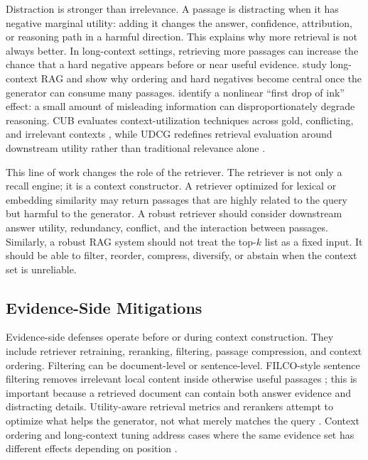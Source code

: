 \documentclass[11pt]{article}
\begin{document}
Distraction is stronger than irrelevance. A passage is distracting when it has negative marginal utility: adding it changes the answer, confidence, attribution, or reasoning path in a harmful direction. This explains why more retrieval is not always better. In long-context settings, retrieving more passages can increase the chance that a hard negative appears before or near useful evidence. \citet{rrag039} study long-context RAG and show why ordering and hard negatives become central once the generator can consume many passages. \citet{rrag003} identify a nonlinear ``first drop of ink'' effect: a small amount of misleading information can disproportionately degrade reasoning. CUB evaluates context-utilization techniques across gold, conflicting, and irrelevant contexts \citep{rrag032}, while UDCG redefines retrieval evaluation around downstream utility rather than traditional relevance alone \citep{rrag058}.

This line of work changes the role of the retriever. The retriever is not only a recall engine; it is a context constructor. A retriever optimized for lexical or embedding similarity may return passages that are highly related to the query but harmful to the generator. A robust retriever should consider downstream answer utility, redundancy, conflict, and the interaction between passages. Similarly, a robust RAG system should not treat the top-$k$ list as a fixed input. It should be able to filter, reorder, compress, diversify, or abstain when the context set is unreliable.

\subsection{Evidence-Side Mitigations}

Evidence-side defenses operate before or during context construction. They include retriever retraining, reranking, filtering, passage compression, and context ordering. Filtering can be document-level or sentence-level. FILCO-style sentence filtering removes irrelevant local content inside otherwise useful passages \citep{rrag044}; this is important because a retrieved document can contain both answer evidence and distracting details. Utility-aware retrieval metrics and rerankers attempt to optimize what helps the generator, not what merely matches the query \citep{rrag058}. Context ordering and long-context tuning address cases where the same evidence set has different effects depending on position \citep{rrag039}.
\end{document}
